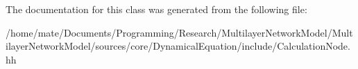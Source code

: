 The documentation for this class was generated from the following file\+:\begin{DoxyCompactItemize}
\item 
/home/mate/\+Documents/\+Programming/\+Research/\+Multilayer\+Network\+Model/\+Multilayer\+Network\+Model/sources/core/\+Dynamical\+Equation/include/Calculation\+Node.\+hh\end{DoxyCompactItemize}
